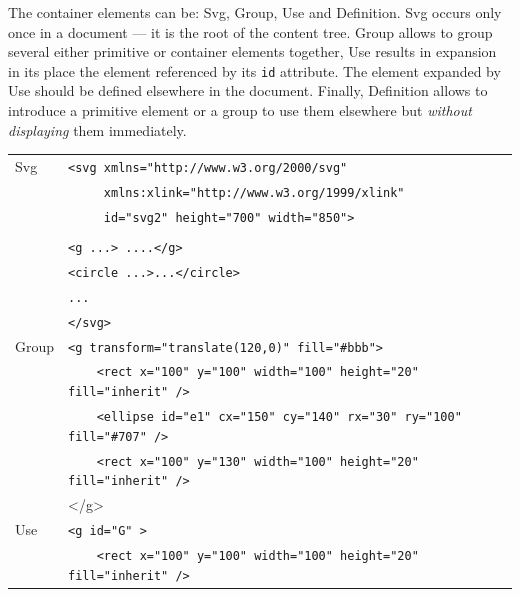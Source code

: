 \documentclass[a4paper]{article}
\begin{document}
The container elements can be: \textsf{Svg}, \textsf{Group}, \textsf{Use} and 
\textsf{Definition}. \textsf{Svg} occurs only once in a document --- it is the root of the
content tree. \textsf{Group} allows to group several either primitive or container elements 
together, \textsf{Use} results in expansion in its place the element referenced by its \verb!id!
attribute. The element expanded by \textsf{Use} should be defined elsewhere in the document.
Finally, \textsf{Definition} allows
to introduce a primitive element or a group to use them elsewhere but \emph{without displaying} 
them immediately.
\begin{center}
\begin{tabular}{|l|l|}
        \hline
        \textsf{Svg} & \verb!<svg xmlns="http://www.w3.org/2000/svg"! \\
        & \verb!     xmlns:xlink="http://www.w3.org/1999/xlink"! \\
        & \verb!     id="svg2" height="700" width="850">! \\
        &  \\
        & \verb!<g ...> ....</g>!\\
        & \verb!<circle ...>...</circle>!\\
        & \verb!...!\\
        & \verb!</svg>!\\
        \hline
        \textsf{Group} & \verb!<g transform="translate(120,0)" fill="#bbb">! \\
        &\verb!    <rect x="100" y="100" width="100" height="20" fill="inherit" />! \\
        &\verb!    <ellipse id="e1" cx="150" cy="140" rx="30" ry="100" fill="#707" />! \\
        &\verb!    <rect x="100" y="130" width="100" height="20" fill="inherit" />! \\
        & </g>\\
        \hline
% 
        \textsf{Use} & \verb!<g id="G" >! \\
        &\verb!    <rect x="100" y="100" width="100" height="20" fill="inherit" />! \\

\end{tabular}
\end{center}
\end{document}

